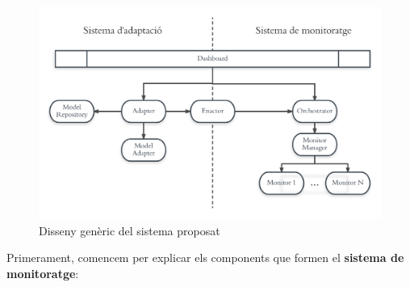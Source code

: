 \begin{figure}
\centering
\includegraphics[width=13cm]{Figures/Figure4}
\decoRule
\caption[Disseny genèric del sistema proposat]{Disseny genèric del sistema proposat}
\label{fig:Figura4}
\end{figure}

Primerament, comencem per explicar els components que formen el \textbf{sistema de monitoratge}:

